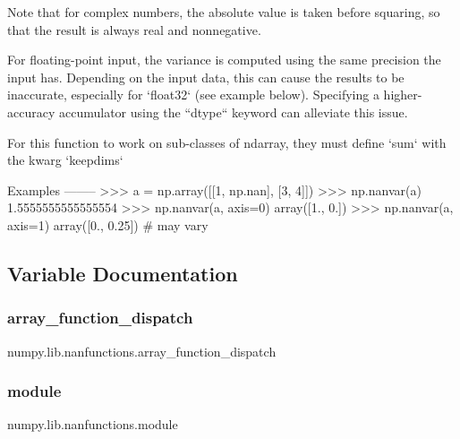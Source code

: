 \begin{DoxyVerb}
Note that for complex numbers, the absolute value is taken before
squaring, so that the result is always real and nonnegative.

For floating-point input, the variance is computed using the same
precision the input has.  Depending on the input data, this can cause
the results to be inaccurate, especially for `float32` (see example
below).  Specifying a higher-accuracy accumulator using the ``dtype``
keyword can alleviate this issue.

For this function to work on sub-classes of ndarray, they must define
`sum` with the kwarg `keepdims`

Examples
--------
>>> a = np.array([[1, np.nan], [3, 4]])
>>> np.nanvar(a)
1.5555555555555554
>>> np.nanvar(a, axis=0)
array([1.,  0.])
>>> np.nanvar(a, axis=1)
array([0.,  0.25])  # may vary\end{DoxyVerb}
 

\subsection{Variable Documentation}
\mbox{\label{namespacenumpy_1_1lib_1_1nanfunctions_a5d66ace42e50dfe8f961bdaad0c9ff6e}} 
\subsubsection{\texorpdfstring{array\+\_\+function\+\_\+dispatch}{array\_function\_dispatch}}
{\footnotesize\ttfamily numpy.\+lib.\+nanfunctions.\+array\+\_\+function\+\_\+dispatch}

\mbox{\label{namespacenumpy_1_1lib_1_1nanfunctions_a909a2bb150c1b122fe91d94ae7774659}} 
\subsubsection{\texorpdfstring{module}{module}}
{\footnotesize\ttfamily numpy.\+lib.\+nanfunctions.\+module}

